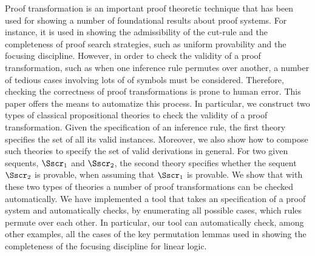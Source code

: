 Proof transformation is an important proof theoretic technique that has
been used for showing a number of foundational results about proof
systems. For instance, it is used in showing the admissibility of the
cut-rule and the completeness of proof search strategies, such as uniform
provability and the focusing discipline. However, in order to check the
validity of a proof transformation, such as when one inference
rule
permutes over another, a number of tedious cases
involving lots of of symbols must be considered. Therefore, checking the correctness of proof
transformations is prone to human error. This paper offers the means to
automatize this process. In particular, 
we construct two
types of classical propositional theories to check the validity of a proof
transformation.
Given the specification of an inference rule, the first theory specifies
the set of all its valid instances. Moreover, we also show how to compose
such theories to specify the set of valid derivations in general. For two
given sequents, $\Sscr_1$ and $\Sscr_2$, the second theory 
specifies whether the sequent $\Sscr_2$ is provable, when assuming that
$\Sscr_1$ is provable. We show that with these two types of theories 
a number of proof transformations can be checked automatically. 
We have implemented a tool that takes an specification of
a proof system and automatically checks,
by enumerating all possible cases, which rules permute over each
other. In particular, our tool can automatically
check, among other examples, all the cases of the key permutation lemmas
used in showing the completeness of the
focusing discipline for linear logic.

